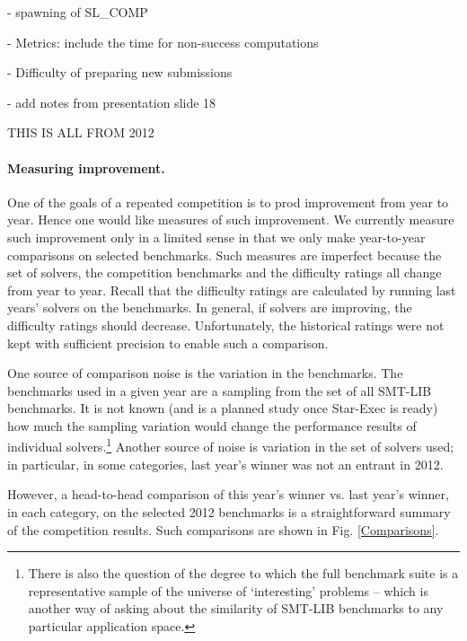\documentclass[twosize,11pt]{article}
\begin{document}
- spawning of SL\_COMP

- Metrics: include the time for non-success computations

- Difficulty of preparing new submissions

- add notes from presentation slide 18

THIS IS ALL FROM 2012

\paragraph{Measuring improvement.}


One of the goals of a repeated competition is to prod improvement from year to year. Hence one would like measures of such improvement. We currently measure such improvement only in a limited sense in that we only make year-to-year comparisons on selected benchmarks. Such measures are imperfect because the set of solvers, the competition benchmarks and the difficulty ratings all change from year to year. Recall that the difficulty ratings are calculated by running last years' solvers on the benchmarks. In general, if solvers are improving, the difficulty ratings should decrease. Unfortunately, the historical ratings were not kept with sufficient precision to enable such a comparison. 

One source of comparison noise is the variation in the benchmarks. The benchmarks used in a given year are a sampling from the set of all SMT-LIB benchmarks. It is not known (and is a planned study once Star-Exec is ready) how much the sampling variation would change the performance results of individual solvers.\footnote{There is also the question of the degree to which the full benchmark suite is a representative sample of the universe of `interesting' problems -- which is another way of asking about the similarity of SMT-LIB benchmarks to any particular application space.} Another source of noise is variation in the set of solvers used; in particular, in some categories, last year's winner was not an entrant in 2012.

However, a head-to-head comparison of this year's winner vs. last year's winner, in each category, on the selected 2012 benchmarks is a straightforward summary of the competition results. Such comparisons are shown in Fig. \ref{Comparisons}.
\end{document}
